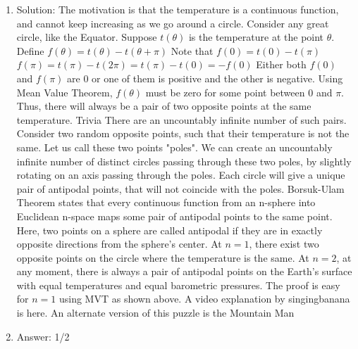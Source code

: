 \begin{enumerate}
\item
Solution: The motivation is that the temperature is a continuous function, and cannot keep increasing as we go around a circle.
Consider any great circle, like the Equator.
Suppose $t(\theta)$ is the temperature at the point $\theta$.
Define $f(\theta) = t(\theta)-t(\theta+\pi)$
Note that $f(0)=t(0)-t(\pi)$
$f(\pi)=t(\pi)-t(2 \pi) = t(\pi)-t(0) = -f(0)$
Either both $f(0)$ and $f(\pi)$ are $0$ or one of them is positive and the other is negative.
Using Mean Value Theorem, $f(\theta)$ must be zero for some point between $0$ and $\pi$.
Thus, there will always be a pair of two opposite points at the same temperature.
Trivia
There are an uncountably infinite number of such pairs. Consider two random opposite points, such that their temperature is not the same. Let us call these two points "poles". We can create an uncountably infinite number of distinct circles passing through these two poles, by slightly rotating on an axis passing through the poles. Each circle will give a unique pair of antipodal points, that will not coincide with the poles.
Borsuk-Ulam Theorem states that every continuous function from an n-sphere into Euclidean n-space maps some pair of antipodal points to the same point. Here, two points on a sphere are called antipodal if they are in exactly opposite directions from the sphere's center.
At $n=1$, there exist two opposite points on the circle where the temperature is the same.
At $n=2$, at any moment, there is always a pair of antipodal points on the Earth's surface with equal temperatures and equal barometric pressures.
The proof is easy for $n=1$ using MVT as shown above.
A video explanation by singingbanana is here. An alternate version of this puzzle is the Mountain Man




\item
Answer: 1/2
 

\end{enumerate}
